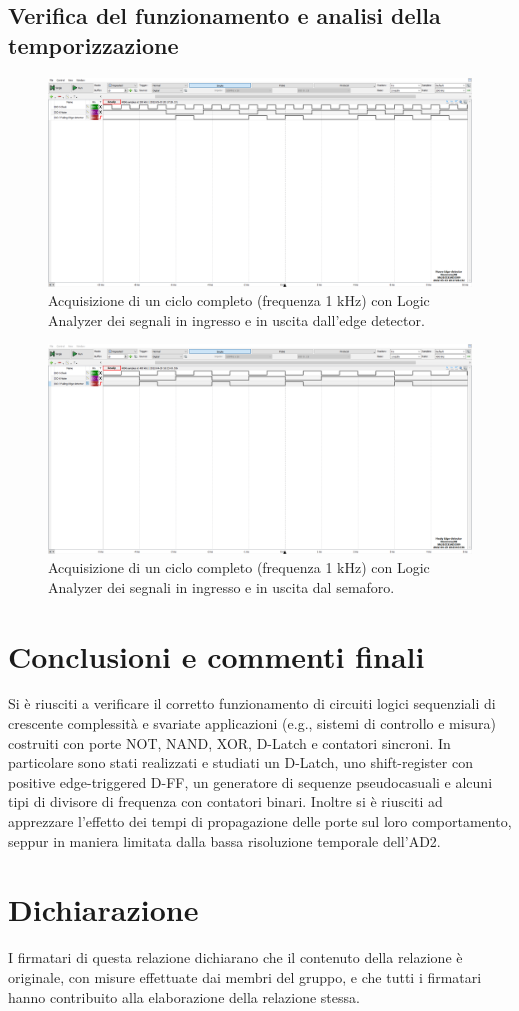 \documentclass[10pt, a4paper, italian]{article}
\begin{document}
\subsection{Verifica del funzionamento e analisi della temporizzazione}
\begin{figure}[htbp]
    \centering
    \includegraphics[width=\textwidth]{Moore_edge_detector}
    \caption{Acquisizione di un ciclo completo (frequenza 1 kHz) con Logic
    Analyzer dei segnali in ingresso e in uscita dall'edge detector.
    \label{fig: edgeMoore}}
\end{figure}

\begin{figure}[htbp]
    \centering
    \includegraphics[width=\textwidth]{Mealy_edge_detector}
    \caption{Acquisizione di un ciclo completo (frequenza 1 kHz) con Logic
    Analyzer dei segnali in ingresso e in uscita dal semaforo.
    \label{fig: edgeMealy}}
\end{figure}

\section*{Conclusioni e commenti finali}
Si è riusciti a verificare il corretto funzionamento di circuiti logici
sequenziali di crescente complessità e svariate applicazioni (e.g., sistemi di
controllo e misura) costruiti con porte NOT, NAND, XOR, D-Latch e contatori
sincroni.
In particolare sono stati realizzati e studiati un D-Latch, uno shift-register
con positive edge-triggered D-FF, un generatore di sequenze pseudocasuali e
alcuni tipi di divisore di frequenza con contatori binari.
Inoltre si è riusciti ad apprezzare l'effetto dei tempi di propagazione
delle porte sul loro comportamento, seppur in maniera limitata dalla bassa
risoluzione temporale dell'AD2.

\section*{Dichiarazione}
I firmatari di questa relazione dichiarano che il contenuto della relazione \`e
originale, con misure effettuate dai membri del gruppo, e che tutti i firmatari
hanno contribuito alla elaborazione della relazione stessa.
\end{document}
